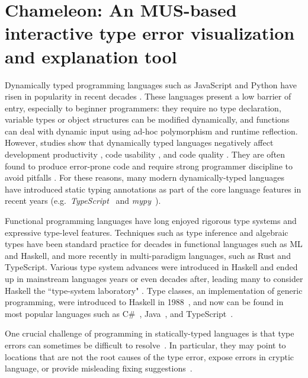 \newcommand{\chameleon}{Chameleon}

\chapter{Chameleon: An MUS-based interactive type error visualization and explanation tool}
\label{chap:chameleon:design} 


Dynamically typed programming languages such as JavaScript and Python have risen in popularity in recent decades \cite{chatley_next_2019}. These languages present a low barrier of entry, especially to beginner programmers: they require no type declaration, variable types or object structures can be modified dynamically, and functions can deal with dynamic input using ad-hoc polymorphism and runtime reflection. However, studies show that dynamically typed languages negatively affect development productivity \cite{kleinschmager_static_2012}, code usability \cite{mayer_empirical_2012}, and code quality \cite{gao_type_2017, ray_large-scale_2017, meyerovich_empirical_2013}. They are often found to produce error-prone code \cite{chen_empirical_2020, wang_empirical_2015,xu_python_2016} and require strong programmer discipline to avoid pitfalls \cite{chen_empirical_2020}. For these reasons, many modern dynamically-typed languages have introduced static typing annotations as part of the core language features in recent years (e.g.\ \textit{TypeScript}~\cite{microsoft_javascript_nodate} and \textit{mypy}~\cite{mypy_mypy_nodate}).

Functional programming languages have long enjoyed rigorous type systems and expressive type-level features. Techniques such as type inference and algebraic types have been standard practice for decades in functional languages such as ML and Haskell, and more recently in multi-paradigm languages, such as Rust and TypeScript. Various type system advances were introduced in Haskell and ended up in mainstream languages years or even decades after, leading many to consider Haskell the ``type-system laboratory" \cite{hudak_history_2007}.  Type classes, an implementation of generic programming, were introduced to Haskell in 1988~\cite{hudak_history_2007}, and now can be found in most popular languages such as C\#~\cite{bill_wagner_constraints_2022}, Java~\cite{oracle_generic_2022}, and TypeScript~\cite{microsoft_documentation_2022}.

One crucial challenge of programming in statically-typed languages is that type errors can sometimes be difficult to resolve~\cite{tirronen_understanding_2015, hage_solved_2020}. In particular, they may point to locations that are not the root  causes of the type error, expose errors in cryptic language, or provide misleading fixing suggestions~\cite{wu_how_2017}.



